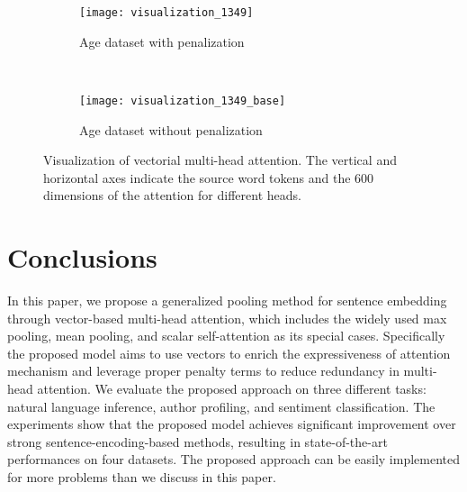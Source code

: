\documentclass[11pt]{article}
\begin{document}
\begin{table*}[t!]
\centering
{}
\caption{Performance with/without the penalization term. The penalization weight is selected from [1,1e-1,1e-2,1e-3,1e-4] on the development sets.}
\label{tab:penalization}
\end{table*}

\begin{figure}[!htb]

\begin{subfigure}{1\textwidth}
  \centering
  \texttt{[image: visualization\_1349]}
  \caption{Age dataset with penalization}
\end{subfigure}\\
\begin{subfigure}{1\textwidth}
  \centering
  \texttt{[image: visualization\_1349\_base]}
  \caption{Age dataset without penalization}
\end{subfigure}
	\caption{Visualization of vectorial multi-head attention. The vertical and horizontal axes indicate the source word tokens and the 600 dimensions of the attention  for different heads. }
	\label{fig:view}
\end{figure}

\section{Conclusions}

In this paper, we propose a generalized pooling method for sentence embedding through vector-based multi-head attention, which includes the widely used max pooling, mean pooling, and scalar self-attention as its special cases. Specifically the proposed model aims to use vectors to enrich the expressiveness of attention mechanism and leverage proper penalty terms to reduce redundancy in multi-head attention. We evaluate the proposed approach on three different tasks: natural language inference, author profiling, and sentiment classification. The experiments show that the proposed model achieves significant improvement over strong sentence-encoding-based methods, resulting in state-of-the-art performances on four datasets. The proposed approach can be easily implemented for more problems than we discuss in this paper. 
\end{document}

